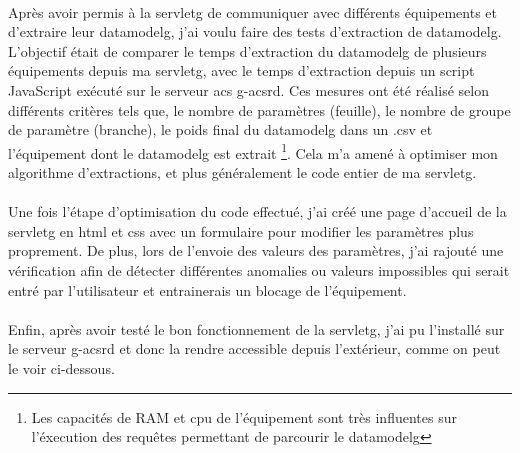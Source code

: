 \documentclass[12pt,a4paper]{report}
\begin{document}
\paragraph*{}Après avoir permis à la \gls{servletg} de communiquer avec différents équipements et d’extraire leur \gls{datamodelg}, j’ai voulu faire des tests d’extraction de \gls{datamodelg}. L’objectif était de comparer le temps d’extraction du \gls{datamodelg} de plusieurs équipements depuis ma \gls{servletg}, avec le temps d’extraction depuis un script JavaScript exécuté sur le serveur \gls{acs} g-acsrd. Ces mesures ont été réalisé selon différents critères tels que, le nombre de paramètres (feuille), le nombre de groupe de paramètre (branche), le poids final du \gls{datamodelg} dans un .csv et l’équipement dont le \gls{datamodelg} est extrait \footnote{Les capacités de RAM et cpu de l'équipement sont très influentes sur l'éxecution des requêtes permettant de parcourir le \gls{datamodelg}}. Cela m’a amené à optimiser mon algorithme d’extractions, et plus généralement le code entier de ma \gls{servletg}.
\paragraph*{}Une fois l’étape d’optimisation du code effectué, j’ai créé une page d'accueil de la \gls{servletg} en html et css avec un formulaire pour modifier les paramètres plus proprement. De plus, lors de l’envoie des valeurs des paramètres, j’ai rajouté une vérification afin de détecter différentes anomalies ou valeurs impossibles qui serait entré par l’utilisateur et entrainerais un blocage de l’équipement.
\paragraph*{}Enfin, après avoir testé le bon fonctionnement de la \gls{servletg}, j’ai pu l’installé sur le serveur g-acsrd et donc la rendre accessible depuis l’extérieur, comme on peut le voir ci-dessous.
\end{document}
